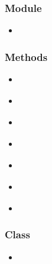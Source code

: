 \documentclass[letterpaper,10pt,english]{sphinxmanual}
\begin{document}
\subsubsection{Module}
\label{api/core/ajax/index:module}\begin{itemize}
\item {}
{\hyperref[api/core/ajax/index:module-io]{}}

\end{itemize}


\subsubsection{Methods}
\label{api/core/ajax/index:methods}\begin{itemize}
\item {}
{\hyperref[api/core/ajax/io:io.io]{}}

\item {}
{\hyperref[api/core/ajax/setupConfig:io.setupConfig]{}}

\item {}
{\hyperref[api/core/ajax/get:io.get]{}}

\item {}
{\hyperref[api/core/ajax/post:io.post]{}}

\item {}
{\hyperref[api/core/ajax/getJSON:io.getJSON]{}}

\item {}
{\hyperref[api/core/ajax/jsonp:io.jsonp]{}}

\item {}
{\hyperref[api/core/ajax/upload:io.upload]{}}

\end{itemize}


\subsubsection{Class}
\label{api/core/ajax/index:class}\begin{itemize}
\item {}
{\hyperref[api/core/ajax/xhr:io.XhrObj]{}}

\end{itemize}
\label{api/core/cookie/index:module-cookie}
\end{document}
